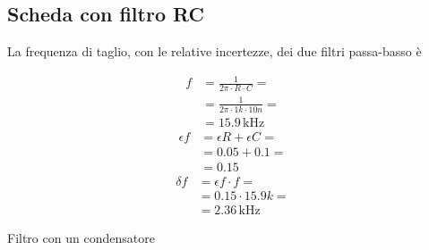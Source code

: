 \documentclass[a4paper]{article}
\begin{document}
		\subsection{Scheda con filtro RC}
			La frequenza di taglio, con le relative incertezze, dei due filtri passa-basso è
			\newline
			\begin{minipage}[t]{0.5\textwidth}
				\centering
				\begin{equation*}
					\begin{split}
						f &= \frac{1}{2 \pi \cdot R \cdot C} = \\
						  &= \frac{1}{2 \pi \cdot 1k \cdot 10n} = \\
						  &= 15.9 \, \mathrm{kHz}
					\end{split}
				\end{equation*}
				\newline
				\begin{equation*}
					\begin{split}
						\epsilon f &= \epsilon R + \epsilon C = \\
								   &= 0.05 + 0.1 = \\
								   &= 0.15
					\end{split}
				\end{equation*}
				\newline
				\begin{equation*}
					\begin{split}
						\delta f &= \epsilon f \cdot f = \\
								 &= 0.15 \cdot 15.9k = \\
								 &= 2.36 \, \mathrm{kHz}
					\end{split}
				\end{equation*}
				\newline
				\begin{scriptsize}
					Filtro con un condensatore
				\end{scriptsize}
			\end{minipage}
\end{document}
